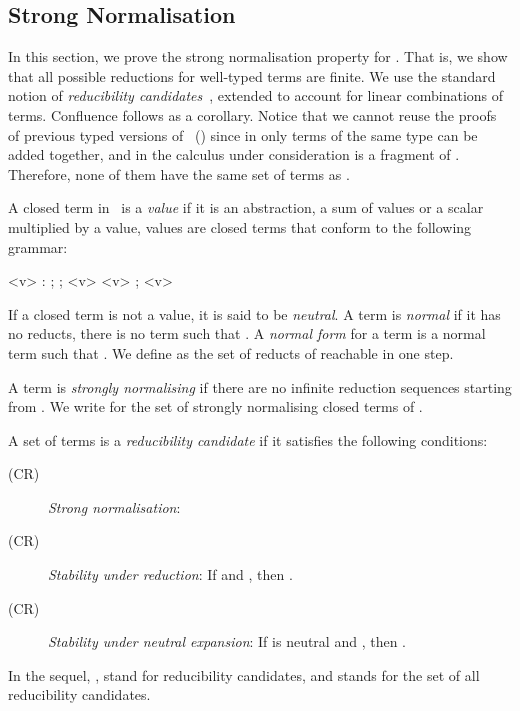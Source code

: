 \subsection{Strong Normalisation}\label{sec:SN}

In this section, we prove the strong normalisation property for
\CA. That is, we show that all possible reductions for well-typed
terms are finite.  We use the standard notion of \emph{reducibility
  candidates}~\cite[Chapter 14]{Girard89}, extended to account for
linear combinations of terms. Confluence follows as a
corollary. Notice that we cannot reuse the proofs of previous typed
versions of \llin\ (\eg \cite{ArrighiDiazcaroQPL09,DiazcaroPetit10})
since in \cite{ArrighiDiazcaroQPL09} only terms of the same type can
be added together, and in \cite{DiazcaroPetit10} the calculus under
consideration is a fragment of \CA. Therefore, none of them have the
same set of terms as \CA.

A closed term in \CA\ is a \emph{value} if it is an abstraction, a sum
of values or a scalar multiplied by a value, \ie values are closed
terms that conform to the following grammar:

\begin{grammar}
  [(colon){::}]
  [(semicolon){}]
  [(period){.}]
  [(nonterminal){\bf}{}]
<v> :  ;  ; <v>  <v> ; <v>
\end{grammar}

If a closed term is not a value, it is said to be \emph{neutral}. A term
 is \emph{normal} if it has no reducts, \ie there is no term
 such that . A \emph{normal form} for a term
 is a normal term  such that .
We define  as the set of reducts of 
reachable in one step. 

A term  is \emph{strongly normalising} if there are no infinite
reduction sequences starting from . We write  for
the set of strongly normalising closed terms of \CA.

\begin{definition}
  A set of terms  is a \emph{reducibility candidate} if
  it satisfies the following conditions:

  \begin{description}
  \item[(CR)] \emph{Strong normalisation}: 
  \item[(CR)] \emph{Stability under reduction}: If
     and , then
    .
  \item[(CR)] \emph{Stability under neutral expansion}: If 
    is neutral and , then
    .
  \end{description}

\noindent  In the sequel, ,  stand for reducibility
  candidates, and  stands for the set of all reducibility
  candidates.
\end{definition}

